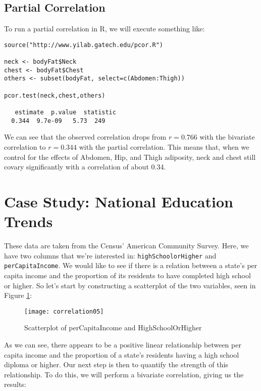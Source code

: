 \subsection{Partial Correlation}

To run a partial correlation in R, we will execute something like:

\begin{framed}
\begin{Verbatim}[samepage=TRUE]
source("http://www.yilab.gatech.edu/pcor.R")

neck <- bodyFat$Neck
chest <- bodyFat$Chest
others <- subset(bodyFat, select=c(Abdomen:Thigh))

pcor.test(neck,chest,others)

   estimate  p.value  statistic
  0.344  9.7e-09   5.73  249
\end{Verbatim}
\end{framed}

We can see that the observed correlation drops from $r=0.766$ with the bivariate correlation to $r=0.344$ with the partial correlation. This means that, when we control for the effects of Abdomen, Hip, and Thigh adiposity, neck and chest still covary significantly with a correlation of about 0.34.

\section{Case Study: National Education Trends}

These data are taken from the Census' American Community Survey. Here, we have two columns that we're interested in: \verb|highSchoolorHigher| and \verb|perCapitaIncome|. We would like to see if there is a relation between a state's per capita income and the proportion of its residents to have completed high school or higher. So let's start by constructing a scatterplot of the two variables, seen in Figure \ref{fig:correlation05}:

\begin{figure}[htp]
	\texttt{[image: correlation05]}
	\caption{Scatterplot of perCapitaIncome and HighSchoolOrHigher}
	\label{fig:correlation05}
\end{figure}

As we can see, there appears to be a positive linear relationship between per capita income and the proportion of a state's residents having a high school diploma or higher. Our next step is then to quantify the strength of this relationship. To do this, we will perform a bivariate correlation, giving us the results:

